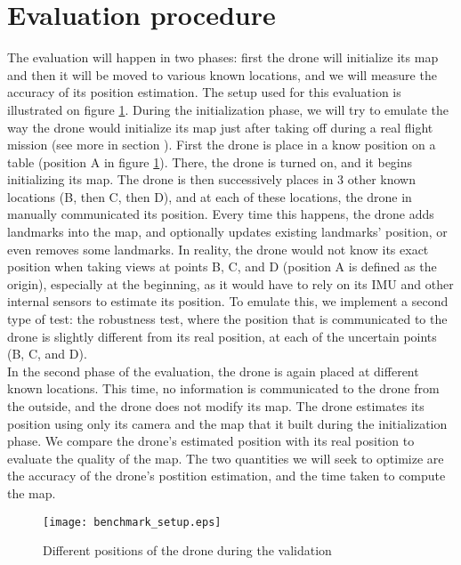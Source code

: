 \section{Evaluation procedure} \label{evalproc}
The evaluation will happen in two phases: first the drone will initialize its map and then it will be moved to various known locations, and we will measure the accuracy of its position estimation. The setup used for this evaluation is illustrated on figure \ref{fig:benchmarksetup}. During the initialization phase, we will try to emulate the way the drone would initialize its map just after taking off during a real flight mission (see more in section %
). First the drone is place in a know position on a table (position A in figure \ref{fig:benchmarksetup}). There, the drone is turned on, and it begins initializing its map. The drone is then successively places in 3 other known locations (B, then C, then D), and at each of these locations, the drone in manually communicated its position. Every time this happens, the drone adds landmarks into the map, and optionally updates existing landmarks' position, or even removes some landmarks. In reality, the drone would not know its exact position when taking views at points B, C, and D (position A is defined as the origin), especially at the beginning, as it would have to rely on its IMU and other internal sensors to estimate its position. To emulate this, we implement a second type of test: the robustness test, where the position that is communicated to the drone is slightly different from its real position, at each of the uncertain points (B, C, and D).\\
In the second phase of the evaluation, the drone is again placed at different known locations. This time, no information is communicated to the drone from the outside, and the drone does not modify its map. The drone estimates its position using only its camera and the map that it built during the initialization phase. We compare the drone's estimated position with its real position to evaluate the quality of the map. The two quantities we will seek to optimize are the accuracy of the drone's postition estimation, and the time taken to compute the map.


\begin{figure}[H]
  \centering
  \texttt{[image: benchmark\_setup.eps]}
  \label{fig:benchmarksetup}
  \caption{Different positions of the drone during the validation}
\end{figure}

